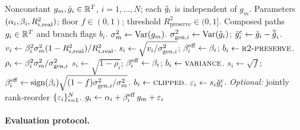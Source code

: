 \begin{algorithm}[t]
\caption{Hybrid single-index model (SIM) composition with variance correction.}
\label{alg:hybrid}
\small
\begin{algorithmic}[1]
  \REQUIRE Nonconstant $g_m,\tilde{g}_i\in\mathbb{R}^T$, $i=1,\dots,N$; each
    $\tilde{g}_i$ is independent of $g_m$.
  \REQUIRE Parameters $(\alpha_i,\beta_i,R^2_{i,\mathrm{real}})$; floor
    $f\in(0,1)$; threshold $R^2_{\mathrm{preserve}}\in(0,1]$.
  \ENSURE Composed paths $g_i\in\mathbb{R}^T$ and branch flags $b_i$.
  \STATE $\sigma_m^2 \gets \operatorname{Var}(g_m)$.
    \STATE $\sigma_{\mathrm{gen},i}^2 \gets \operatorname{Var}(\tilde{g}_i)$;
      $\tilde{g}_i^{\mathrm c} \gets \tilde{g}_i-\overline{\tilde{g}}_i$.
      \STATE $v_i \gets \beta_i^2\sigma_m^2(1-R^2_{i,\mathrm{real}})/R^2_{i,\mathrm{real}}$.
      \STATE $s_i \gets \sqrt{v_i/\sigma_{\mathrm{gen},i}^2}$;
        $\beta_i^{\mathrm{eff}} \gets \beta_i$; $b_i\gets\textsc{r2-preserve}$.
    \ELSE
      \STATE $\rho_i \gets \beta_i^2 \sigma_m^2 / \sigma_{\mathrm{gen},i}^2$
        \STATE $s_i \gets \sqrt{1-\rho_i}$;
          $\beta_i^{\mathrm{eff}}\gets\beta_i$; $b_i\gets\textsc{variance}$.
      \ELSE
        \STATE $s_i\gets\sqrt{f}$;
          $\beta_i^{\mathrm{eff}}\gets\operatorname{sign}(\beta_i)
          \sqrt{(1-f)\sigma_{\mathrm{gen},i}^2/\sigma_m^2}$.
        \STATE $b_i\gets\textsc{clipped}$.
      \ENDIF
    \ENDIF
    \STATE $\varepsilon_i \gets s_i\tilde{g}_i^{\mathrm c}$.
  \ENDFOR
  \STATE \textit{Optional:} jointly rank-reorder $\{\varepsilon_i\}_{i=1}^{N}$.
    \STATE $g_i \gets \alpha_i + \beta_i^{\mathrm{eff}}\, g_m + \varepsilon_i$
      \hfill {}
  \ENDFOR
\end{algorithmic}
\end{algorithm}

\FloatBarrier

\paragraph{Evaluation protocol.}

